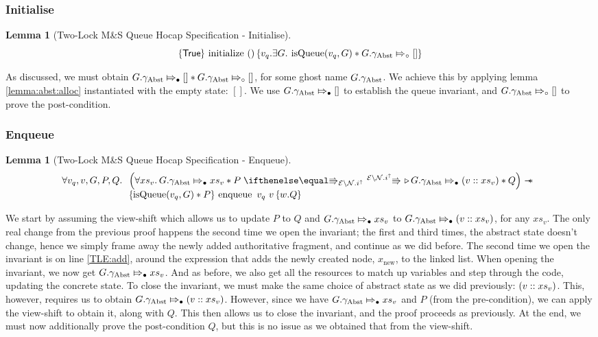 \documentclass[a4paper, 10pt]{report}
\theoremstyle{definition}
\newtheorem{lemma}[theorem]{Lemma}
\newcommand{\initialise}{\operatorname{initialize}}
\newcommand{\enqueue}{\operatorname{enqueue}}
\newcommand{\msq}{M\&S Queue}
\newcommand{\tlmsq}{Two-Lock \msq{}}
\newcommand{\isqueue}{\operatorname{isQueue}}
\newcommand{\vq}{v_q}
\newcommand{\node}{x}
\newcommand{\nodeN}[1]{\node_{\mathrm{#1}}}
\newcommand{\nodenew}{\nodeN{new}}
\newcommand{\absvalue}{\val}
\newcommand{\absvalueList}{xs_v}
\newcommand{\Qg}{G}
\newcommand{\gabst}{\gname_{\mathrm{Abst}}}
\newcommand{\Nl}{\ensuremath{\mathcal{N}}}
\newcommand{\abstractstatefullfrag}[2]{#1 \Mapsto_{\circ} #2}
\newcommand{\abstractstateauth}[2]{#1 \Mapsto_{\bullet} #2}
\newcommand{\hocapspecinitHTGen}[2]{\hoare{\TRUE}{\initialise \ \TT}{#1 . \Exists #2 . \isqueue(#1, #2) \star{} \abstractstatefullfrag{#2.\gabst}{[]}}}
\newcommand{\hocapspecinitGen}[2]{\hocapspecinitHTGen{#1}{#2}}
\newcommand{\hocapspecinit}{\hocapspecinitGen{\vq}{\Qg}}
\newcommand{\hocapspecenqVS}[5]{\abstractstateauth{#2.\gabst}{#5} \star{} #3 \vs[\mask\setminus\Nl.i^\uparrow] \later \abstractstateauth{#2.\gabst}{(#1 :: #5)} \star{} #4}
\newcommand{\hocapspecenqHT}[5]{\hoare{\isqueue(#1, #3) \star{} #4}{\enqueue \ #1 \ #2}{\valB . #5}}
\newcommand{\hocapspecenqGen}[6]{\All #1, #2, #3, #4, #5.
\begin{array}[t]{l}
\left(\All #6 . \hocapspecenqVS{#2}{#3}{#4}{#5}{#6} \right)
\wand\\
\hocapspecenqHT{#1}{#2}{#3}{#4}{#5}
\end{array}}
\newcommand{\hocapspecenq}{\hocapspecenqGen{\vq}{\absvalue}{\Qg}{P}{Q}{\absvalueList}}
\begin{document}
\subsubsection{Initialise}
\begin{lemma}[\tlmsq{} Hocap Specification - Initialise]\label{TLMSQ:spec:hocap:initialise}
  \begin{equation*}
    \hocapspecinit
  \end{equation*}
\end{lemma}
As discussed, we must obtain $\abstractstateauth{\Qg.\gabst}{[]} \star{} \abstractstatefullfrag{\Qg.\gabst}{[]}$, for some ghost name $\Qg.\gabst$. We achieve this by applying lemma \ref{lemma:abst:alloc} instantiated with the empty state: $[]$. We use $\abstractstateauth{\Qg.\gabst}{[]}$ to establish the queue invariant, and $\abstractstatefullfrag{\Qg.\gabst}{[]}$ to prove the post-condition.


\subsubsection{Enqueue}
\begin{lemma}[\tlmsq{} Hocap Specification - Enqueue]\label{TLMSQ:spec:hocap:enqueue}
  \begin{equation*}
    \hocapspecenq
  \end{equation*}
\end{lemma}
We start by assuming the view-shift which allows us to update $P$ to $Q$ and $\abstractstateauth{\Qg.\gabst}{\absvalueList}$ to $\abstractstateauth{\Qg.\gabst}{(\absvalue :: \absvalueList)}$, for any $\absvalueList$. The only real change from the previous proof happens the second time we open the invariant; the first and third times, the abstract state doesn't change, hence we simply frame away the newly added authoritative fragment, and continue as we did before. The second time we open the invariant is on line \ref{TLE:add}, around the expression that adds the newly created node, $\nodenew$, to the linked list. When opening the invariant, we now get $\abstractstateauth{\Qg.\gabst}{\absvalueList}$. And as before, we also get all the resources to match up variables and step through the code, updating the concrete state. To close the invariant, we must make the same choice of abstract state as we did previously: $(\absvalue :: \absvalueList)$. This, however, requires us to obtain $\abstractstateauth{\Qg.\gabst}{(\absvalue :: \absvalueList)}$. However, since we have $\abstractstateauth{\Qg.\gabst}{\absvalueList}$ and $P$ (from the pre-condition), we can apply the view-shift to obtain it, along with $Q$. This then allows us to close the invariant, and the proof proceeds as previously. At the end, we must now additionally prove the post-condition $Q$, but this is no issue as we obtained that from the view-shift.
\end{document}
